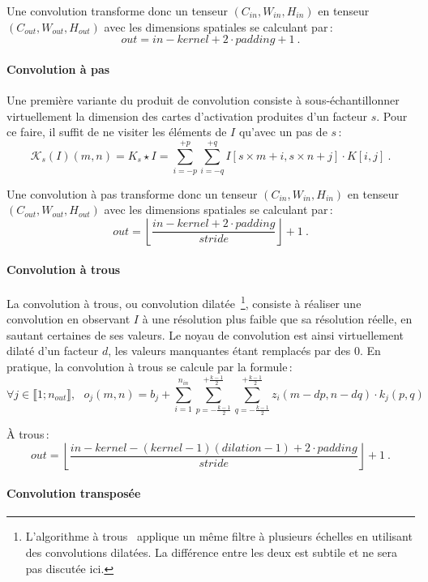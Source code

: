 Une convolution transforme donc un tenseur $(C_{in}, W_{in}, H_{in})$ en tenseur $(C_{out}, W_{out}, H_{out})$ avec les dimensions spatiales se calculant par\,:
$$\mathit{out} = \mathit{in} - \mathit{kernel} + 2\cdot \mathit{padding} + 1~.$$

\paragraph{Convolution à pas}

Une première variante du produit de convolution consiste à sous-échantillonner virtuellement la dimension des cartes d'activation produites d'un facteur $s$. Pour ce faire, il suffit de ne visiter les éléments de $I$ qu'avec un pas de $s$\,:
$$\mathcal{K}_s(I)(m,n) = K_s \star I = \sum_{i=-p}^{+p} \sum_{i=-q}^{+q} I[s\times{}m + i, s\times{}n + j] \cdot K[i, j]~.$$

Une convolution à pas transforme donc un tenseur $(C_{in}, W_{in}, H_{in})$ en tenseur $(C_{out}, W_{out}, H_{out})$ avec les dimensions spatiales se calculant par\,:
$$\mathit{out} = \left\lfloor \frac{\mathit{in} - \mathit{kernel} + 2 \cdot \mathit{padding}}{\mathit{stride}}\right\rfloor + 1~.$$

\paragraph{Convolution à trous}

La convolution à trous, ou convolution dilatée~\cite{yu_multi-scale_2015}\footnote{L'algorithme à trous~\cite{shensa_discrete_1992} applique un même filtre à plusieurs échelles en utilisant des convolutions dilatées. La différence entre les deux est subtile et ne sera pas discutée ici.}, consiste à réaliser une convolution en observant $I$ à une résolution plus faible que sa résolution réelle, en sautant certaines de ses valeurs. Le noyau de convolution est ainsi virtuellement dilaté d'un facteur $d$, les valeurs manquantes étant remplacés par des 0. En pratique, la convolution à trous se calcule par la formule\,:
$$\forall j \in \llbracket 1;n_{out} \rrbracket,~~~o_j(m, n) = b_j + \sum_{i=1}^{n_{in}} \sum_{p=-\frac{k-1}{2}}^{+\frac{k-1}{2}} \sum_{q=-\frac{k-1}{2}}^{+\frac{k-1}{2}} z_i(m - dp, n - dq) \cdot k_j(p, q)$$

À trous\,:
$$\mathit{out} = \left\lfloor \frac{\mathit{in} - \mathit{kernel} - (\mathit{kernel} -1)(\mathit{dilation} - 1) + 2 \cdot \mathit{padding}}{\mathit{stride}}\right\rfloor + 1~.$$


\paragraph{Convolution transposée}


